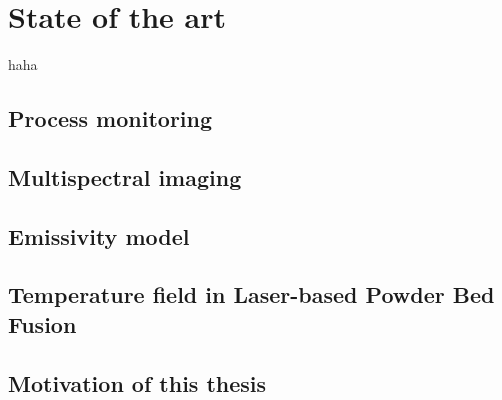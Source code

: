 \chapter{State of the art}%
haha\cite{Bammer.2010}
%
%
\section{Process monitoring}%

%
%
\section{Multispectral imaging}%

%
%
\section{Emissivity model}%

%
%
\section{Temperature field in Laser-based Powder Bed Fusion}


\section{Motivation of this thesis}